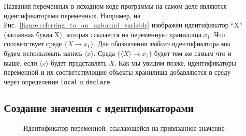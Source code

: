 Названия переменных в исходном коде программы на самом деле являются идентификаторами переменных. Например, на Рис.~\ref{figure:referring_to_an_unbound_variable} изображён идентификатор ``X'' (заглавная буква X), которая ссылается на переменную хранилища $x_{1}$. Что соответствует среде $\{X \to x_{1}\}$. Для обозначения \emph{любого} идентификатора мы будем использовать запись $\langle x \rangle$. Среда $\{\langle X \rangle \to x_{1}\}$ будет тем же самым что и выше, если $\langle x \rangle$ будет представлять $X$. Как мы увидим позже, идентификаторы переменной и их соответствующие объекты хранилища добавляются в среду через определения \lstinline|local| и \lstinline|declare|.



\subsection{Создание значения с идентификаторами}

\begin{figure}
\caption{Идентификатор переменной, ссылающейся на привязанное значение}
\label{figure:identifier_referring_to_a_bound_variable}
\end{figure}

